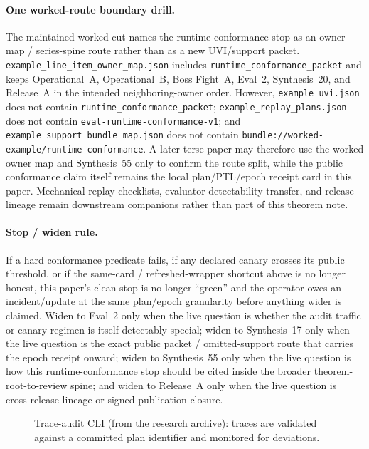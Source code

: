 \documentclass[11pt]{article}
\begin{document}
\paragraph{One worked-route boundary drill.}
The maintained worked cut names the runtime-conformance stop as an owner-map / series-spine route rather than as a new UVI/support packet. \nolinkurl{example_line_item_owner_map.json} includes \nolinkurl{runtime_conformance_packet} and keeps Operational~A, Operational~B, Boss Fight~A, Eval~2, Synthesis~20, and Release~A in the intended neighboring-owner order. However, \nolinkurl{example_uvi.json} does not contain \nolinkurl{runtime_conformance_packet}; \nolinkurl{example_replay_plans.json} does not contain \nolinkurl{eval-runtime-conformance-v1}; and \nolinkurl{example_support_bundle_map.json} does not contain \nolinkurl{bundle://worked-example/runtime-conformance}. A later terse paper may therefore use the worked owner map and Synthesis~55 only to confirm the route split, while the public conformance claim itself remains the local plan/PTL/epoch receipt card in this paper. Mechanical replay checklists, evaluator detectability transfer, and release lineage remain downstream companions rather than part of this theorem note.\cite{series:workedexample,series:auditorreplay,series:eval1,series:releaseproperty}

\paragraph{Stop / widen rule.}
If a hard conformance predicate fails, if any declared canary crosses its public threshold, or if the same-card / refreshed-wrapper shortcut above is no longer honest, this paper's clean stop is no longer ``green'' and the operator owes an incident/update at the same plan/epoch granularity before anything wider is claimed. Widen to Eval~2 only when the live question is whether the audit traffic or canary regimen is itself detectably special; widen to Synthesis~17 only when the live question is the exact public packet / omitted-support route that carries the epoch receipt onward; widen to Synthesis~55 only when the live question is how this runtime-conformance stop should be cited inside the broader theorem-root-to-review spine; and widen to Release~A only when the live question is cross-release lineage or signed publication closure.\cite{series:advantagecontracts,series:workedexample,series:seriesspines,series:releaseproperty}

\begin{figure}[t]
  \centering
  \caption{Trace-audit CLI (from the research archive): traces are validated against a committed plan identifier and monitored for deviations.}
  \label{fig:cli}
\end{figure}
\end{document}
